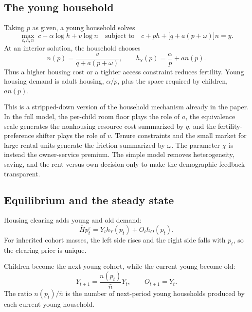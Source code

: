 \documentclass[11pt]{article}
\theoremstyle{definition}
\newcommand{\1}{\mathbf 1}
\begin{document}
\subsection{The young household}

Taking $p$ as given, a young household solves
\begin{equation}
 \max_{c,h,n}\;c+\alpha\log h+v\log n
 \quad\text{subject to}\quad
 c+ph+\bigl[q+a(p+\omega)\bigr]n=y.
 \label{eq:young_problem}
\end{equation}
At an interior solution, the household chooses
\begin{equation}
 n(p)=\frac{v}{q+a(p+\omega)},
 \qquad
 h_Y(p)=\frac{\alpha}{p}+a n(p).
 \label{eq:young_demands}
\end{equation}
Thus a higher housing cost or a tighter access constraint reduces fertility.
Young housing demand is adult housing, $\alpha/p$, plus the space required by
children, $a n(p)$.

This is a stripped-down version of the household mechanism already in the
paper. In the full model, the per-child room floor plays the role of $a$, the
equivalence scale generates the nonhousing resource cost summarized by $q$,
and the fertility-preference shifter plays the role of $v$. Tenure constraints
and the small market for large rental units generate the friction summarized
by $\omega$. The parameter $\chi$ is instead the owner-service premium. The
simple model removes heterogeneity, saving, and the rent-versus-own decision
only to make the demographic feedback transparent.

\subsection{Equilibrium and the steady state}

Housing clearing adds young and old demand:
\begin{equation}
 \bar H p_t^\varepsilon
 =Y_t h_Y(p_t)+O_t h_O(p_t).
 \label{eq:two_generation_clearing}
\end{equation}
For inherited cohort masses, the left side rises and the right side falls with
$p_t$, so the clearing price is unique.

Children become the next young cohort, while the current young become old:
\begin{equation}
 Y_{t+1}=\frac{n(p_t)}{\bar n}Y_t,
 \qquad O_{t+1}=Y_t.
 \label{eq:two_generation_law}
\end{equation}
The ratio $n(p_t)/\bar n$ is the number of next-period young households
produced by each current young household.
\end{document}
